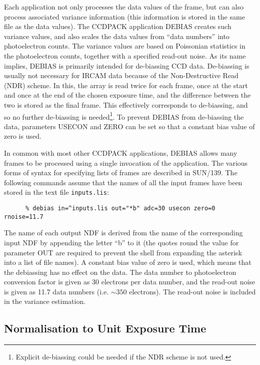 Each application not only processes the data values of the frame, but
can also process associated variance information (this information is
stored in the same file as the data values). The {\small CCDPACK}
application {\small DEBIAS} creates such variance values, and also
scales the data values from ``data numbers'' into photoelectron counts.
The variance values are based on Poissonian statistics in the
photoelectron counts, together with a specified read-out noise. As its
name implies, {\small DEBIAS} is primarily intended for de-biassing
{\small CCD} data. De-biassing is usually not necessary for {\small
IRCAM} data because of the Non-Destructive Read ({\small NDR}) scheme.
In this, the array is read twice for each frame, once at the start and
once at the end of the chosen exposure time, and the difference between
the two is stored as the final frame. This effectively corresponds to
de-biassing, and so no further de-biassing is needed\footnote{Explicit
de-biassing could be needed if the NDR scheme is not used.}. To prevent
{\small DEBIAS} from de-biassing the data, parameters {\small USECON}
and {\small ZERO} can be set so that a constant bias value of zero is
used.

In common with most other {\small CCDPACK} applications, {\small
DEBIAS} allows many frames to be processed using a single invocation of
the application. The various forms of syntax for specifying lists of
frames are described in SUN/139.  The following commands assume that
the names of all the input frames have been stored in the text file
\verb+inputs.lis+:

\small
\begin{verbatim}
      % debias in=^inputs.lis out="*b" adc=30 usecon zero=0 rnoise=11.7
\end{verbatim}
\normalsize

The name of each output {\small NDF} is derived from the name of the
corresponding input {\small NDF} by appending the letter ``b'' to it
(the quotes round the value for parameter {\small OUT} are required to
prevent the shell from expanding the asterisk into a list of file
names). A constant bias value of zero is used, which means that the
debiassing has no effect on the data. The data number to photoelectron
conversion factor is given as 30 electrons per data number, and the
read-out noise is given as 11.7 data numbers (i.e. $\sim350$
electrons). The read-out noise is included in the variance estimation.

\subsection{Normalisation to Unit Exposure Time}

